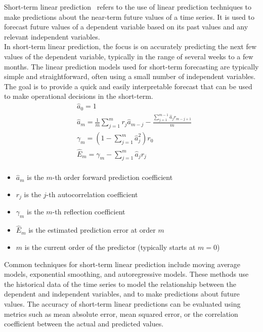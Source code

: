 Short-term linear prediction~\cite{Riahy} refers to the use of linear prediction techniques to make predictions about
the near-term future values of a time series. It is used to forecast future values of a dependent variable based on
its past values and any relevant independent variables.
\\
In short-term linear prediction, the focus is on accurately predicting the next few values of the dependent variable,
typically in the range of several weeks to a few months. The linear prediction models used for short-term
forecasting are typically simple and straightforward, often using a small number of independent variables.
The goal is to provide a quick and easily interpretable forecast that can be used to make operational decisions in
the short-term.
\begin{equation}
    \label{eq:slp}
    \begin{aligned}
        &\hat{a}_0 = 1 \\
        &\hat{a}_m = \frac{1}{m} \sum_{j=1}^{m} r_j \hat{a}_{m-j} - \frac{\sum_{j=1}^{m-1} \hat{a}_j r_{m-j+1}}{m} \\
        &\gamma_m = (1 - \sum_{j=1}^{m} \hat{a}_j^2) r_0 \\
        &\hat{E}_m = \gamma_m - \sum_{j=1}^{m} \hat{a}_j r_{j} \\
    \end{aligned}
\end{equation}
\begin{itemize}
    \item $\hat{a}_m$ is the $m$-th order forward prediction coefficient
    \item $r_j$ is the $j$-th autocorrelation coefficient
    \item $\gamma_m$ is the $m$-th reflection coefficient
    \item $\hat{E}_m$ is the estimated prediction error at order $m$
    \item $m$ is the current order of the predictor (typically starts at $m=0$)
\end{itemize}

Common techniques for short-term linear prediction include moving average models, exponential smoothing, and
autoregressive models. These methods use the historical data of the time series to model the relationship between the
dependent and independent variables, and to make predictions about future values. The accuracy of short-term linear
predictions can be evaluated using metrics such as mean absolute error, mean squared error, or the correlation
coefficient between the actual and predicted values.

